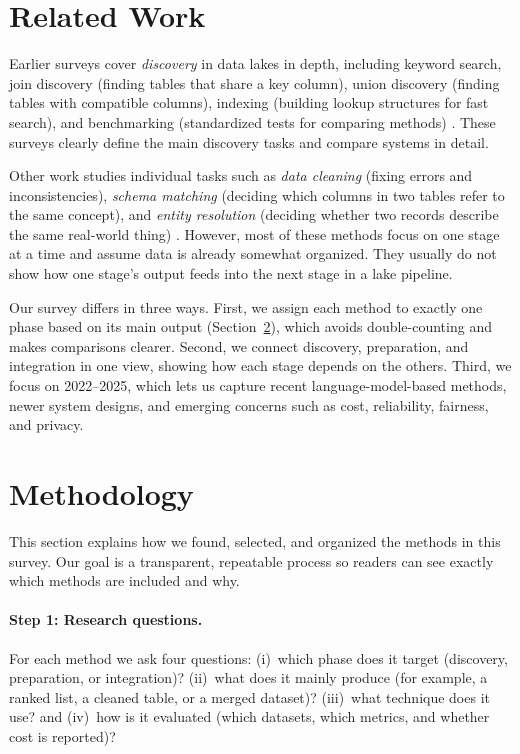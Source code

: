 \documentclass[sigconf,nonacm]{acmart}
\begin{document}
\section{Related Work}
\label{sec:related}
Earlier surveys cover \emph{discovery} in data lakes in depth, including keyword search, join discovery (finding tables that share a key column), union discovery (finding tables with compatible columns), indexing (building lookup structures for fast search), and benchmarking (standardized tests for comparing methods) \cite{10.1145/3555041.3589409,10.14778/3750601.3750694}. These surveys clearly define the main discovery tasks and compare systems in detail.

Other work studies individual tasks such as \emph{data cleaning} (fixing errors and inconsistencies), \emph{schema matching} (deciding which columns in two tables refer to the same concept), and \emph{entity resolution} (deciding whether two records describe the same real-world thing) \cite{10.14778/3675034.3675051,10.14778/3742728.3742757,10.1145/3588722}. However, most of these methods focus on one stage at a time and assume data is already somewhat organized. They usually do not show how one stage's output feeds into the next stage in a lake pipeline.

Our survey differs in three ways. First, we assign each method to exactly one phase based on its main output (Section~\ref{sec:methodology}), which avoids double-counting and makes comparisons clearer. Second, we connect discovery, preparation, and integration in one view, showing how each stage depends on the others. Third, we focus on 2022--2025, which lets us capture recent language-model-based methods, newer system designs, and emerging concerns such as cost, reliability, fairness, and privacy.


\section{Methodology}
\label{sec:methodology}
This section explains how we found, selected, and organized the methods in this survey. Our goal is a transparent, repeatable process so readers can see exactly which methods are included and why.

\paragraph{Step 1: Research questions.}
For each method we ask four questions: (i)~which phase does it target (discovery, preparation, or integration)? (ii)~what does it mainly produce (for example, a ranked list, a cleaned table, or a merged dataset)? (iii)~what technique does it use? and (iv)~how is it evaluated (which datasets, which metrics, and whether cost is reported)?
\end{document}
